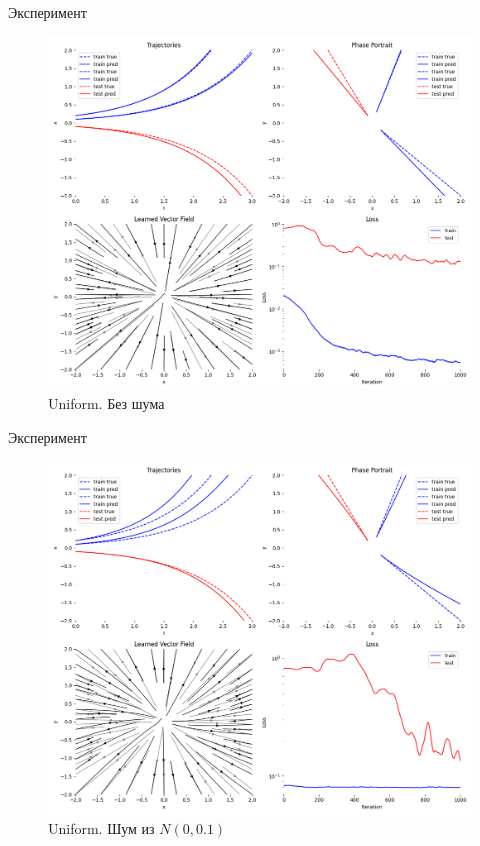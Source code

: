 \documentclass{beamer}
\begin{document}
\begin{frame}{Эксперимент}
\begin{figure}
 \centering
 \includegraphics[width=0.8\linewidth]{uniform-0.0}
 \caption{Uniform. Без шума}
\end{figure}
\end{frame}

\begin{frame}{Эксперимент}
\begin{figure}
 \centering
 \includegraphics[width=0.8\linewidth]{uniform-0.1}
 \caption{Uniform. Шум из $N(0, 0.1)$}
\end{figure}
\end{frame}
\end{document}
